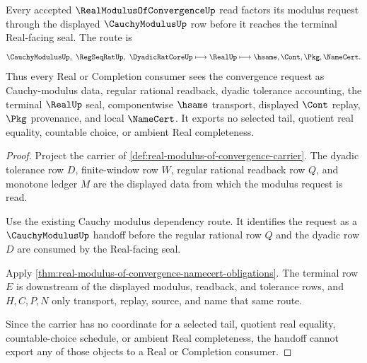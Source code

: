\begin{theorem}
\label{thm:real-modulus-convergence-cauchy-modulus-handoff}
Every accepted $\RealModulusOfConvergenceUp$ read factors its modulus request through the displayed $\CauchyModulusUp$ row before it reaches the terminal Real-facing seal. The route is
$$
\CauchyModulusUp,\ \RegSeqRatUp,\ \DyadicRatCoreUp
\longmapsto \RealUp
\longmapsto \hsame,\Cont,\Pkg,\NameCert .
$$
Thus every Real or Completion consumer sees the convergence request as Cauchy-modulus data, regular rational readback, dyadic tolerance accounting, the terminal $\RealUp$ seal, componentwise $\hsame$ transport, displayed $\Cont$ replay, $\Pkg$ provenance, and local $\NameCert$. It exports no selected tail, quotient real equality, countable choice, or ambient Real completeness.
\end{theorem}
\begin{proof}
Project the carrier of \autoref{def:real-modulus-of-convergence-carrier}. The dyadic tolerance row $D$, finite-window row $W$, regular rational readback row $Q$, and monotone ledger $M$ are the displayed data from which the modulus request is read.

Use the existing Cauchy modulus dependency route. It identifies the request as a $\CauchyModulusUp$ handoff before the regular rational row $Q$ and the dyadic row $D$ are consumed by the Real-facing seal.

Apply \autoref{thm:real-modulus-of-convergence-namecert-obligations}. The terminal row $E$ is downstream of the displayed modulus, readback, and tolerance rows, and $H,C,P,N$ only transport, replay, source, and name that same route.

Since the carrier has no coordinate for a selected tail, quotient real equality, countable-choice schedule, or ambient Real completeness, the handoff cannot export any of those objects to a Real or Completion consumer.
\end{proof}

